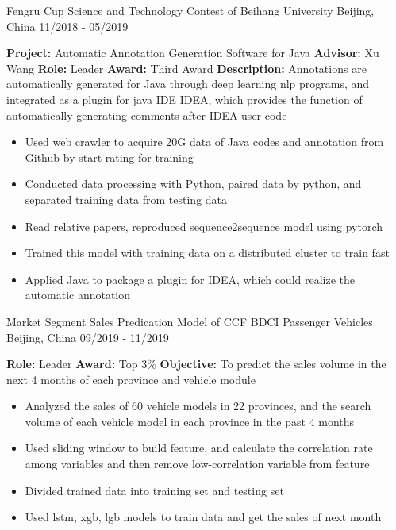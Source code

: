 

\begin{cventries}
  
  \cventry
    {}
    {Fengru Cup Science and Technology Contest of Beihang University}
    {Beijing, China}
    {11/2018 - 05/2019}
    {
      \textbf{Project:} Automatic Annotation Generation Software for Java \quad \textbf{Advisor:} Xu Wang
      \newline
      \textbf{Role:} Leader
      \newline
      \textbf{Award:} Third Award
      \newline
      \textbf{Description:} Annotations are automatically generated for Java through deep learning nlp programs, and integrated as a plugin for java IDE IDEA, which provides the function of automatically generating comments after IDEA user code
      \begin{itemize}
        \item {Used web crawler to acquire 20G data of Java codes and annotation from Github by start rating for training}
        \item {Conducted data processing with Python, paired data by python, and separated training data from testing data}
        \item {Read relative papers, reproduced sequence2sequence model using pytorch}
        \item {Trained this model with training data on a distributed cluster to train fast}
        \item {Applied Java to package a plugin for IDEA, which could realize the automatic annotation}
      \end{itemize}
    }

  \cventry
    {}
    {Market Segment Sales Predication Model of CCF BDCI Passenger Vehicles}
    {Beijing, China}
    {09/2019 - 11/2019}
    {
      \textbf{Role:} Leader
      \newline
      \textbf{Award:} Top 3\%
      \newline
      \textbf{Objective:} To predict the sales volume in the next 4 months of each province and vehicle module
      \begin{itemize}
        \item {Analyzed the sales of 60 vehicle models in 22 provinces, and the search volume of each vehicle model in each province in the past 4 months}
        \item {Used sliding window to build feature, and calculate the correlation rate among variables and then remove low-correlation variable from feature}
        \item {Divided trained data into training set and testing set}
        \item {Used lstm, xgb, lgb models to train data and get the sales of next month}
      \end{itemize}
    }


\end{cventries}
